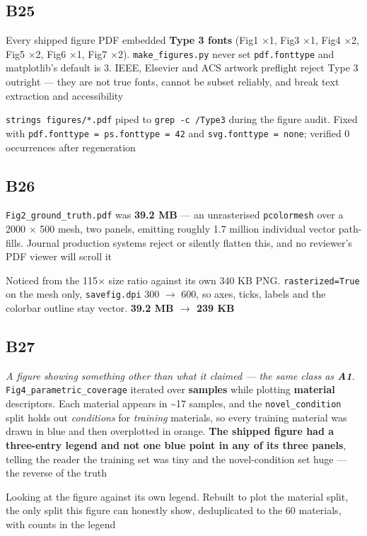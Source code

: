 \documentclass[10pt]{article}
\begin{document}
\subsection*{B25}\label{led:B25}
\begin{description}[leftmargin=0pt,itemsep=1pt]
\item[Defect.] Every shipped figure PDF embedded \textbf{Type 3 fonts} (Fig1 $\times$1, Fig3 $\times$1, Fig4 $\times$2, Fig5 $\times$2, Fig6 $\times$1, Fig7 $\times$2). \texttt{make\_figures.py} never set \texttt{pdf.fonttype} and matplotlib's default is 3. IEEE, Elsevier and ACS artwork preflight reject Type 3 outright --- they are not true fonts, cannot be subset reliably, and break text extraction and accessibility
\item[How it was caught.] \texttt{strings figures/*.pdf} piped to \texttt{grep -c /Type3} during the figure audit. Fixed with \texttt{pdf.fonttype = ps.fonttype = 42} and \texttt{svg.fonttype = none}; verified 0 occurrences after regeneration
\end{description}
\subsection*{B26}\label{led:B26}
\begin{description}[leftmargin=0pt,itemsep=1pt]
\item[Defect.] \texttt{Fig2\_ground\_truth.pdf} was \textbf{39.2 MB} --- an unrasterised \texttt{pcolormesh} over a 2000 $\times$ 500 mesh, two panels, emitting roughly 1.7 million individual vector path-fills. Journal production systems reject or silently flatten this, and no reviewer's PDF viewer will scroll it
\item[How it was caught.] Noticed from the 115$\times$ size ratio against its own 340 KB PNG. \texttt{rasterized=True} on the mesh only, \texttt{savefig.dpi} 300 $\rightarrow$ 600, so axes, ticks, labels and the colorbar outline stay vector. \textbf{39.2 MB $\rightarrow$ 239 KB}
\end{description}
\subsection*{B27}\label{led:B27}
\begin{description}[leftmargin=0pt,itemsep=1pt]
\item[Defect.] \emph{A figure showing something other than what it claimed --- the same class as \textbf{A1}.} \texttt{Fig4\_parametric\_coverage} iterated over \textbf{samples} while plotting \textbf{material} descriptors. Each material appears in \textasciitilde{}17 samples, and the \texttt{novel\_condition} split holds out \emph{conditions} for \emph{training} materials, so every training material was drawn in blue and then overplotted in orange. \textbf{The shipped figure had a three-entry legend and not one blue point in any of its three panels}, telling the reader the training set was tiny and the novel-condition set huge --- the reverse of the truth
\item[How it was caught.] Looking at the figure against its own legend. Rebuilt to plot the material split, the only split this figure can honestly show, deduplicated to the 60 materials, with counts in the legend
\end{description}
\end{document}

